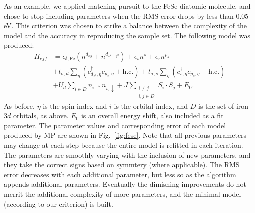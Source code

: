 As an example, we applied matching pursuit to the FeSe diatomic molecule, and chose to stop including parameters when the RMS error drops by less than 0.05 eV.
This criterion was chosen to strike a balance between the complexity of the model and the accuracy in reproducing the sample set.
The following model was produced:
\begin{align}
  H_{eff}
  &=
  \epsilon_{\delta,\mathrm{Fe}} (n^{d_{xy}} + n^{d_{x^2-y^2}})
  +
  \epsilon_s n^{s}
  +
  \epsilon_{z} n^{p_z}
  \nonumber \\
  &+ 
  t_{\sigma,d} \sum_{\eta} \left( c_{d_{z^2},\eta}^{\dagger} c_{p_z,\eta} + \text{h.c.} \right)
  +
  t_{\sigma,s} \sum_{\eta} \left(c_{s,\eta}^{\dagger}  c_{p_z,\eta} + \text{h.c.} \right)
  \nonumber \\
  &+
  U_d \sum_{i \in D} n_{i,\uparrow} n_{i,\downarrow} 
  +
  J \sum_{\substack{i\ne j \\i,j \in D}} S_i \cdot S_j
  +
  E_0. \label{eq:fesemodel}
\end{align}
As before, $\eta$ is the spin index and $i$ is the orbital index, and $D$ is the set of iron $3d$ orbitals, as above.
$E_0$ is an overall energy shift, also included as a fit parameter.
The parameter values and corresponding error of each model produced by MP are shown in Fig.~\ref{fig:fese}.
Note that all previous parameters may change at each step because the entire model is refitted in each iteration.
The parameters are smoothly varying with the inclusion of new parameters, and they take the correct signs based on symmtery (where applicable). 
The RMS error decreases with each additional parameter, but less so as the algorithm appends additional parameters. 
Eventually the dimishing improvements do not merrit the additional complexity of more parameters, and the minimal model (according to our criterion) is built.


